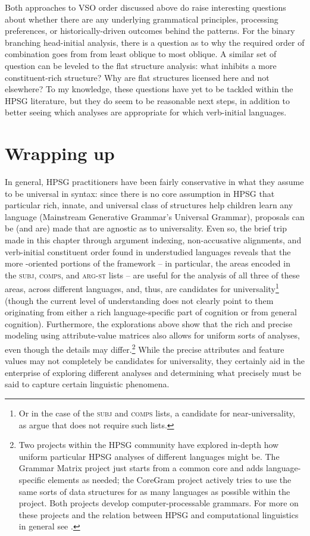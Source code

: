 \documentclass[output=paper
 	        ,biblatex
                ,babelshorthands
                ,newtxmath
                ,draftmode
                ,colorlinks, citecolor=brown
]{langscibook}
\begin{document}
Both approaches to VSO order discussed above do raise interesting questions about whether there are any underlying grammatical principles, processing preferences, or historically-driven outcomes behind the patterns. For the binary branching head-initial analysis, there is a question as to why the required order of combination goes from from least oblique to most oblique. A similar set of question can be leveled to the flat structure analysis: what inhibits a more constituent-rich structure? Why are flat structures licensed here and not elsewhere? To my knowledge, these questions have yet to be tackled within the HPSG literature, but they do seem to be reasonable next steps, in addition to better seeing which analyses are appropriate for which verb-initial languages. 
	
\section{Wrapping up}

In general, HPSG practitioners have been fairly conservative in what they assume to be universal in syntax: since there is no core assumption in HPSG that particular rich, innate, and universal class of structures help children learn any language (Mainstream Generative Grammar's Universal Grammar), proposals can be (and are) made that are agnostic as to universality. Even so, the brief trip made in this chapter through argument indexing, non-accusative alignments, and verb-initial constituent order found in understudied languages reveals that the more -oriented portions of the framework -- in particular, the areas encoded in the \textsc{subj}, \textsc{comps}, and \textsc{arg-st} lists -- are useful for the analysis of all three of these areas, across different languages, and, thus, are candidates for universality\footnote{Or in the case of the \textsc{subj} and \textsc{comps} lists, a candidate for near-universality, as \citet{KM15} argue that  does not require such lists.} (though the current level of understanding does not clearly point to them originating from either a rich language-specific part of cognition or from general cognition). Furthermore, the explorations above show that the rich and precise modeling using attribute-value matrices also allows for uniform sorts of analyses, even though the details may differ.\footnote{Two projects within the HPSG community have explored in-depth how uniform particular HPSG analyses of different languages might be. The Grammar Matrix project \citep{BDFPS2010a-u} just starts from a common core and adds language-specific elements as needed; the CoreGram project \citep{MuellerCoreGram} actively tries to use the same sorts of data structures for as many languages as possible within the project. Both projects develop computer-processable grammars. For more on these projects and the relation between HPSG and computational linguistics in general see .} While the precise attributes and feature values may not completely be candidates for universality, they certainly aid in the enterprise of exploring different analyses and determining what precisely must be said to capture certain linguistic phenomena. 
\end{document}
